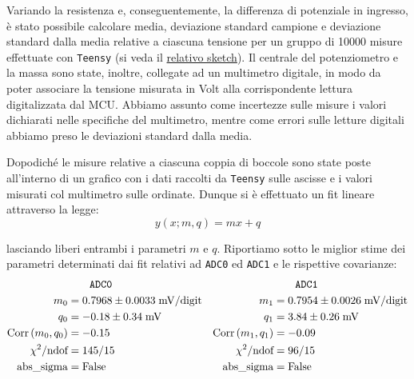 \documentclass{article}[a4paper, oneside, 11pt]
\begin{document}
Variando la resistenza e, conseguentemente, la differenza di potenziale in 
ingresso, \`e stato possibile calcolare media, deviazione standard campione
e deviazione standard dalla media relative a ciascuna tensione per 
un gruppo di 10000 misure effettuate con \verb+Teensy+ (si veda il 
\href{https://github.com/LucaCiucci/relaz_seme/blob/master/sketches/teensy_calib/teensy_calib.ino}{relativo sketch}).
Il centrale del potenziometro e la massa sono state, inoltre, collegate ad un
multimetro digitale, in modo da poter associare la tensione misurata in
Volt alla corrispondente lettura digitalizzata dal MCU. Abbiamo assunto come
incertezze sulle misure i valori dichiarati nelle specifiche del multimetro,
mentre come errori sulle letture digitali abbiamo preso le deviazioni standard
dalla media.

Dopodich\'e le misure relative a ciascuna coppia di boccole sono state poste 
all’interno di un grafico con i dati raccolti da \verb+Teensy+ sulle ascisse
e i valori misurati col multimetro sulle ordinate. Dunque si \`e effettuato un
fit lineare attraverso la legge:
\begin{equation}
y(x; m, q)  = m x + q
\end{equation}

lasciando liberi entrambi i parametri $m$ e $q$. Riportiamo sotto le miglior
stime dei parametri determinati dai fit relativi ad \verb+ADC0+ ed \verb+ADC1+ 
e le rispettive covarianze:
\begin{align*}
&\qquad \texttt{ADC0}	&&\qquad  \texttt{ADC1} \\
m_0 &= 0.7968 \pm  0.0033  \; \mathrm{mV/digit} 
& m_1  &= 0.7954 \pm 0.0026  \; \mathrm{mV/digit} \\
q_0 &= - 0.18 \pm 0.34  \; \si{\mV} 	
&q_1 &= 3.84  \pm 0.26  \; \si{\mV} \\
\corr{m_0} {q_0} &= - 0.15      &\corr{m_1}{q_1} &= - 0.09 \\
\chi^2/\text{ndof} &= 145/15	&\chi^2/\text{ndof} &= 96/15 \\ 
\text{abs\_sigma} &= \rm False	&\text{abs\_sigma} &= \rm False
\end{align*}

\begin{figure}[H]
\centering
\begin{subfigure}{.5\textwidth}
	\def\svgwidth{\columnwidth}
	
\label{fig: cal0}
\end{subfigure}%
\begin{subfigure}{.5\textwidth}
	\def\svgwidth{\columnwidth}
	
\label{fig: cal1}
\end{subfigure}
\end{figure}
\end{document}
